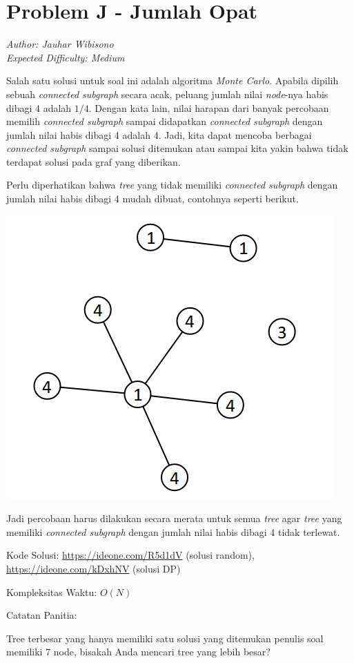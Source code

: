 \section*{Problem J - Jumlah Opat}
\textit{Author: Jauhar Wibisono}
\\
\textit{Expected Difficulty: Medium}

Salah satu solusi untuk soal ini adalah algoritma \textit{Monte Carlo}. Apabila dipilih sebuah \textit{connected subgraph} secara acak, peluang jumlah nilai \textit{node}-nya habis dibagi 4 adalah $1/4$. Dengan kata lain, nilai harapan dari banyak percobaan memilih \textit{connected subgraph} sampai didapatkan \textit{connected subgraph} dengan jumlah nilai habis dibagi 4 adalah 4. Jadi, kita dapat mencoba berbagai \textit{connected subgraph} sampai solusi ditemukan atau sampai kita yakin bahwa tidak terdapat solusi pada graf yang diberikan.

Perlu diperhatikan bahwa \textit{tree} yang tidak memiliki \textit{connected subgraph} dengan jumlah nilai habis dibagi 4 mudah dibuat, contohnya seperti berikut.
\begin{center}
	\includegraphics{arkavidia-2021-qual-jumlah-opat/impossible.png}
\end{center}
Jadi percobaan harus dilakukan secara merata untuk semua \textit{tree} agar \textit{tree} yang memiliki \textit{connected subgraph} dengan jumlah nilai habis dibagi 4 tidak terlewat.

Kode Solusi: \url{https://ideone.com/R5d1dV} (solusi random), \url{https://ideone.com/kDxhNV} (solusi DP)

Kompleksitas Waktu: $O(N)$

Catatan Panitia:

Tree terbesar yang hanya memiliki satu solusi yang ditemukan penulis soal memiliki 7 node, bisakah Anda mencari tree yang lebih besar?